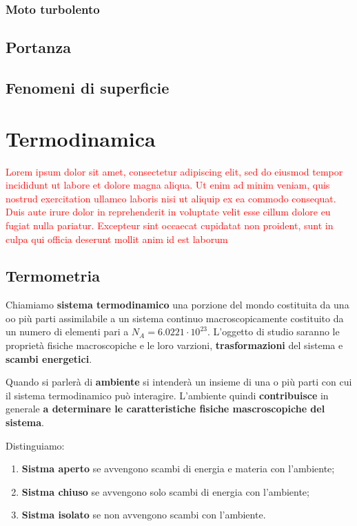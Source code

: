 \documentclass[x11names]{article}
\begin{document}
		\subsubsection{Moto turbolento}
		
	\subsection{Portanza}
	\subsection{Fenomeni di superficie}
	
	
	
	
	
	
	
	
\newpage
\section{Termodinamica}
\textcolor{red}{Lorem ipsum dolor sit amet, consectetur adipiscing elit, sed do eiusmod tempor incididunt ut labore et dolore magna aliqua. Ut enim ad minim veniam, quis nostrud exercitation ullamco laboris nisi ut aliquip ex ea commodo consequat. Duis aute irure dolor in reprehenderit in voluptate velit esse cillum dolore eu fugiat nulla pariatur. Excepteur sint occaecat cupidatat non proident, sunt in culpa qui officia deserunt mollit anim id est laborum}


\subsection{Termometria}
Chiamiamo \textbf{sistema termodinamico} una porzione del mondo costituita da una oo più parti assimilabile a un sistema continuo macroscopicamente costituito da un numero di elementi pari a \(N_A = 6.0221 \cdot 10^{23}\). L'oggetto di studio saranno le proprietà fisiche macroscopiche e le loro varzioni, \textbf{trasformazioni} del sistema e \textbf{scambi energetici}.

Quando si parlerà di \textbf{ambiente} si intenderà un insieme di una o più parti con cui il sistema termodinamico può interagire. L'ambiente quindi \textbf{contribuisce} in generale \textbf{a determinare le caratteristiche fisiche mascroscopiche del sistema}.

Distinguiamo:
\begin{enumerate}
	\item \textbf{Sistma aperto} se avvengono scambi di energia e materia con l'ambiente;
	\item \textbf{Sistma chiuso} se avvengono solo scambi di energia con l'ambiente;
	\item \textbf{Sistma isolato} se non avvengono scambi con l'ambiente.
\end{enumerate}
\end{document}
